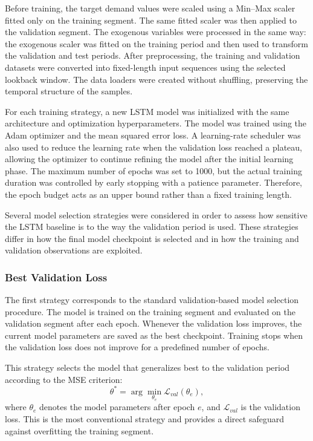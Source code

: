 Before training, the target demand values were scaled using a Min--Max scaler fitted only on the training segment. The same fitted scaler was then applied to the validation segment. The exogenous variables were processed in the same way: the exogenous scaler was fitted on the training period and then used to transform the validation and test periods. After preprocessing, the training and validation datasets were converted into fixed-length input sequences using the selected lookback window. The data loaders were created without shuffling, preserving the temporal structure of the samples.

For each training strategy, a new LSTM model was initialized with the same architecture and optimization hyperparameters. The model was trained using the Adam optimizer and the mean squared error loss. A learning-rate scheduler was also used to reduce the learning rate when the validation loss reached a plateau, allowing the optimizer to continue refining the model after the initial learning phase. The maximum number of epochs was set to 1000, but the actual training duration was controlled by early stopping with a patience parameter. Therefore, the epoch budget acts as an upper bound rather than a fixed training length.

Several model selection strategies were considered in order to assess how sensitive the LSTM baseline is to the way the validation period is used. These strategies differ in how the final model checkpoint is selected and in how the training and validation observations are exploited.

\subsubsection{Best Validation Loss}

The first strategy corresponds to the standard validation-based model selection procedure. The model is trained on the training segment and evaluated on the validation segment after each epoch. Whenever the validation loss improves, the current model parameters are saved as the best checkpoint. Training stops when the validation loss does not improve for a predefined number of epochs.

This strategy selects the model that generalizes best to the validation period according to the MSE criterion:
\[
    \theta^{*} = \arg\min_{\theta_e} \mathcal{L}_{val}(\theta_e),
\]
where \(\theta_e\) denotes the model parameters after epoch \(e\), and \(\mathcal{L}_{val}\) is the validation loss. This is the most conventional strategy and provides a direct safeguard against overfitting the training segment.

